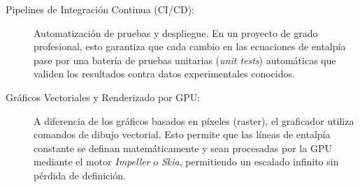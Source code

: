 \begin{description}

        \item[Pipelines de Integración Continua (CI/CD):] Automatización de pruebas y despliegue. En un proyecto de grado profesional, esto garantiza que cada cambio en las ecuaciones de entalpía pase por una batería de pruebas unitarias (\textit{unit tests}) automáticas que validen los resultados contra datos experimentales conocidos.
        \item[Gráficos Vectoriales y Renderizado por GPU:] A diferencia de los gráficos basados en píxeles (raster), el graficador utiliza comandos de dibujo vectorial. Esto permite que las líneas de entalpía constante se definan matemáticamente y sean procesadas por la GPU mediante el motor \textit{Impeller} o \textit{Skia}, permitiendo un escalado infinito sin pérdida de definición.
    \end{description}


